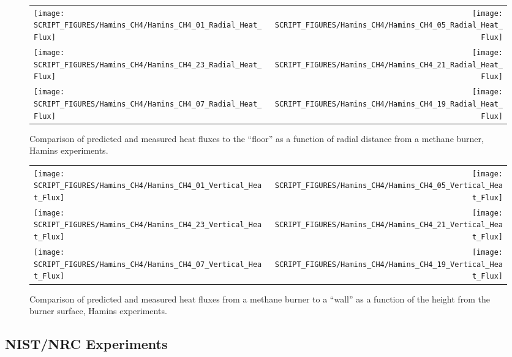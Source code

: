 \begin{figure}[p]
\begin{tabular*}{\textwidth}{l@{\extracolsep{\fill}}r}
\texttt{[image: SCRIPT\_FIGURES/Hamins\_CH4/Hamins\_CH4\_01\_Radial\_Heat\_Flux]} &
\texttt{[image: SCRIPT\_FIGURES/Hamins\_CH4/Hamins\_CH4\_05\_Radial\_Heat\_Flux]} \\
\texttt{[image: SCRIPT\_FIGURES/Hamins\_CH4/Hamins\_CH4\_23\_Radial\_Heat\_Flux]} &
\texttt{[image: SCRIPT\_FIGURES/Hamins\_CH4/Hamins\_CH4\_21\_Radial\_Heat\_Flux]} \\
\texttt{[image: SCRIPT\_FIGURES/Hamins\_CH4/Hamins\_CH4\_07\_Radial\_Heat\_Flux]} &
\texttt{[image: SCRIPT\_FIGURES/Hamins\_CH4/Hamins\_CH4\_19\_Radial\_Heat\_Flux]}
\end{tabular*}
\label{Hamins_CH4_Radial}
\caption[Radial heat flux predictions, Hamins methane burner experiments.]
{Comparison of predicted and measured heat fluxes to the ``floor'' as a function of radial distance from a methane burner, Hamins experiments.}
\end{figure}

\begin{figure}[p]
\begin{tabular*}{\textwidth}{l@{\extracolsep{\fill}}r}
\texttt{[image: SCRIPT\_FIGURES/Hamins\_CH4/Hamins\_CH4\_01\_Vertical\_Heat\_Flux]} &
\texttt{[image: SCRIPT\_FIGURES/Hamins\_CH4/Hamins\_CH4\_05\_Vertical\_Heat\_Flux]} \\
\texttt{[image: SCRIPT\_FIGURES/Hamins\_CH4/Hamins\_CH4\_23\_Vertical\_Heat\_Flux]} &
\texttt{[image: SCRIPT\_FIGURES/Hamins\_CH4/Hamins\_CH4\_21\_Vertical\_Heat\_Flux]} \\
\texttt{[image: SCRIPT\_FIGURES/Hamins\_CH4/Hamins\_CH4\_07\_Vertical\_Heat\_Flux]} &
\texttt{[image: SCRIPT\_FIGURES/Hamins\_CH4/Hamins\_CH4\_19\_Vertical\_Heat\_Flux]}
\end{tabular*}
\label{Hamins_CH4_Vertical}
\caption[Vertical heat flux predictions, Hamins methane burner experiments.]
{Comparison of predicted and measured heat fluxes from a methane burner to a ``wall'' as a function of the height from the burner surface, Hamins experiments.}
\end{figure}



\clearpage


\subsection{NIST/NRC Experiments}

